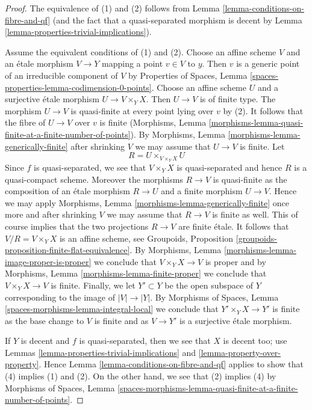 \documentclass{stacks-project}
\theoremstyle{plain}
\theoremstyle{definition}
\theoremstyle{remark}
\numberwithin{equation}{subsection}
\begin{document}
\begin{proof}
The equivalence of (1) and (2) follows from
Lemma \ref{lemma-conditions-on-fibre-and-qf}
(and the fact that a quasi-separated morphism is decent by
Lemma \ref{lemma-properties-trivial-implications}).

\medskip\noindent
Assume the equivalent conditions of (1) and (2). Choose an affine scheme $V$
and an \'etale morphism $V \to Y$ mapping a point $v \in V$ to $y$. Then $v$
is a generic point of an irreducible component of $V$ by
Properties of Spaces, Lemma
\ref{spaces-properties-lemma-codimension-0-points}.
Choose an affine scheme $U$
and a surjective \'etale morphism $U \to V \times_Y X$. Then $U \to V$ is of
finite type. The morphism $U \to V$ is quasi-finite at every point lying over
$v$ by (2). It follows that the fibre of $U \to V$ over $v$ is finite
(Morphisms, Lemma
\ref{morphisms-lemma-quasi-finite-at-a-finite-number-of-points}). By
Morphisms, Lemma \ref{morphisms-lemma-generically-finite}
after shrinking $V$ we may assume that $U \to V$ is finite.
Let
$$
R = U \times_{V \times_Y X} U
$$
Since $f$ is quasi-separated, we see that $V \times_Y X$ is quasi-separated
and hence $R$ is a quasi-compact scheme. Moreover the morphisms
$R \to V$ is quasi-finite as the composition of an \'etale morphism
$R \to U$ and a finite morphism $U \to V$. Hence we may apply
Morphisms, Lemma \ref{morphisms-lemma-generically-finite}
once more and after shrinking $V$ we may assume that $R \to V$ is
finite as well. This of course implies that the two projections
$R \to V$ are finite \'etale. It follows that
$V/R = V \times_Y X$ is an affine scheme, see
Groupoids, Proposition \ref{groupoids-proposition-finite-flat-equivalence}.
By Morphisms, Lemma \ref{morphisms-lemma-image-proper-is-proper}
we conclude that $V \times_Y X \to V$ is proper and by
Morphisms, Lemma \ref{morphisms-lemma-finite-proper}
we conclude that $V \times_Y X \to V$ is finite.
Finally, we let $Y' \subset Y$ be the open subspace of $Y$
corresponding to the image of $|V| \to |Y|$.
By Morphisms of Spaces, Lemma \ref{spaces-morphisms-lemma-integral-local}
we conclude that $Y' \times_Y X \to Y'$ is finite as the base
change to $V$ is finite and as $V \to Y'$ is a surjective \'etale
morphism.

\medskip\noindent
If $Y$ is decent and $f$ is quasi-separated, then we see that
$X$ is decent too; use Lemmas
\ref{lemma-properties-trivial-implications} and
\ref{lemma-property-over-property}.
Hence Lemma \ref{lemma-conditions-on-fibre-and-qf}
applies to show that (4) implies (1) and (2). On the other hand,
we see that (2) implies (4) by Morphisms of Spaces, Lemma
\ref{spaces-morphisms-lemma-quasi-finite-at-a-finite-number-of-points}.
\end{proof}
\end{document}
